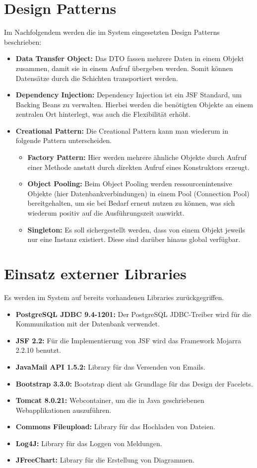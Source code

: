 \section{Design Patterns}
Im Nachfolgendem werden die im System eingesetzten Design Patterns beschrieben:
	\begin{itemize}
		\item \textbf{Data Transfer Object:} Das DTO fassen mehrere Daten in einem Objekt zusammen, damit sie in einem Aufruf übergeben werden. Somit können Datensätze durch die Schichten transportiert werden.
		\item \textbf{Dependency Injection:} Dependency Injection ist ein JSF Standard, um Backing Beans zu verwalten. Hierbei werden die benötigten Objekte an einem zentralen Ort hinterlegt, was auch die Flexibilität erhöht.  
		\item \textbf{Creational Pattern:} Die Creational Pattern kann man wiederum in folgende Pattern unterscheiden.
			\begin{itemize}
				\item \textbf{Factory Pattern:} Hier werden mehrere ähnliche Objekte durch Aufruf einer Methode anstatt durch direkten Aufruf eines Konstruktors erzeugt.
				\item \textbf{Object Pooling:} Beim Object Pooling werden ressourcenintensive Objekte (hier Datenbankverbindungen) in einem Pool (Connection Pool) bereitgehalten, um sie bei Bedarf erneut nutzen zu können, was sich wiederum positiv auf die Ausführungszeit auswirkt.
				\item \textbf{Singleton:} Es soll sichergestellt werden, dass von einem Objekt jeweils nur eine Instanz existiert. Diese sind darüber hinaus global verfügbar.  
			\end{itemize}
	\end{itemize}
\section{Einsatz externer Libraries}
Es werden im System auf bereits vorhandenen Libraries zurückgegriffen.
	\begin{itemize}
		\item \textbf{PostgreSQL JDBC 9.4-1201:} Der PostgreSQL JDBC-Treiber wird für die Kommunikation mit der Datenbank verwendet.
		\item \textbf{JSF 2.2:} Für die Implementierung von JSF wird das Framework Mojarra 2.2.10 benutzt.
		\item \textbf{JavaMail API 1.5.2:} Library für das Versenden von Emails.
		\item \textbf{Bootstrap 3.3.0:} Bootstrap dient als Grundlage für das Design der Facelets.
		\item \textbf{Tomcat 8.0.21:} Webcontainer, um die in Java geschriebenen Webapplikationen auszuführen.
		\item \textbf{Commons Fileupload:} Library für das Hochladen von Dateien.
		\item \textbf{Log4J:} Library für das Loggen von Meldungen.
		\item \textbf{JFreeChart:} Library für die Erstellung von Diagrammen.  
	\end{itemize}
